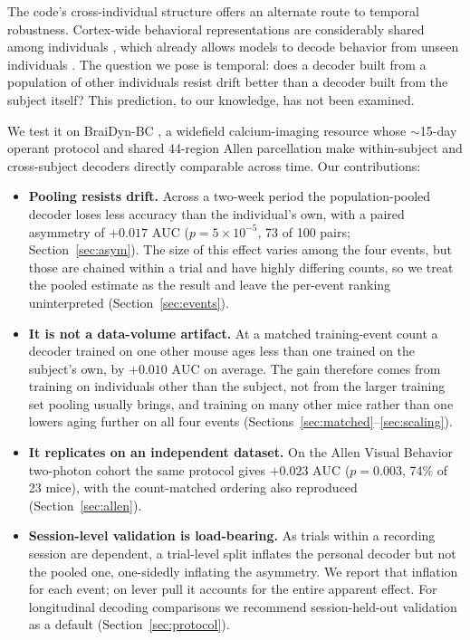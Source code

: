 \documentclass[mlabstract,onecolumn]{jmlr}
\newcommand{\auc}{\mathrm{AUC}}
\begin{document}
The code's cross-individual structure offers an alternate route to temporal robustness. Cortex-wide
behavioral representations are considerably shared among individuals
\citep{musall2019,macdowell2020,macdowell2024}, which already allows models to decode behavior from
unseen individuals \citep{wicat2026}. The question we pose is temporal: does a decoder built from a
population of other individuals resist drift better than a decoder built from the subject itself?
This prediction, to our knowledge, has not been examined.

We test it on BraiDyn-BC \citep{kondo2025}, a widefield calcium-imaging resource whose $\sim$15-day
operant protocol and shared 44-region Allen parcellation make within-subject and cross-subject
decoders directly comparable across time. Our contributions:
\begin{itemize}\itemsep2pt
\item \textbf{Pooling resists drift.} Across a two-week period the population-pooled decoder loses
less accuracy than the individual's own, with a paired asymmetry of $+0.017$ $\auc$
($p = 5 \times 10^{-5}$, 73 of 100 pairs; Section~\ref{sec:asym}). The size of this effect varies
among the four events, but those are chained within a trial and have highly differing counts, so we
treat the pooled estimate as the result and leave the per-event ranking uninterpreted
(Section~\ref{sec:events}).
\item \textbf{It is not a data-volume artifact.} At a matched training-event count a decoder trained
on one other mouse ages less than one trained on the subject's own, by $+0.010$ $\auc$ on average.
The gain therefore comes from training on individuals other than the subject, not from the larger
training set pooling usually brings, and training on many other mice rather than one lowers aging
further on all four events (Sections~\ref{sec:matched}--\ref{sec:scaling}).
\item \textbf{It replicates on an independent dataset.} On the Allen Visual Behavior two-photon
cohort the same protocol gives $+0.023$ $\auc$ ($p = 0.003$, 74\% of 23 mice), with the
count-matched ordering also reproduced (Section~\ref{sec:allen}).
\item \textbf{Session-level validation is load-bearing.} As trials within a recording session are
dependent, a trial-level split inflates the personal decoder but not the pooled one, one-sidedly
inflating the asymmetry. We report that inflation for each event; on lever pull it accounts for the
entire apparent effect. For longitudinal decoding comparisons we recommend session-held-out
validation as a default (Section~\ref{sec:protocol}).
\end{itemize}
\end{document}
